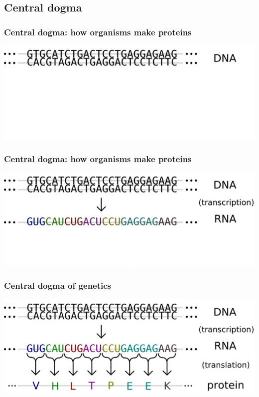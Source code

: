 \documentclass[handout]{beamer}
\numberwithin{equation}{section}
\begin{document}
\subsection{Central dogma}


\begin{frame}
\frametitle{Central dogma: how organisms make proteins}
\begin{center}
\includegraphics[scale=.23]{fig/dogma1.png}
\end{center}
\end{frame}

\begin{frame}
\frametitle{Central dogma: how organisms make proteins}
\begin{center}
\includegraphics[scale=.23]{fig/dogma2.png}
\end{center}
\end{frame}


\begin{frame}
\frametitle{Central dogma of genetics}
\begin{center}
\includegraphics[scale=.23]{fig/dogma3.png}
\end{center}
\end{frame}
\end{document}
